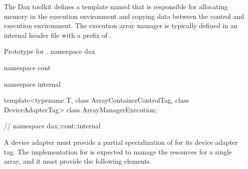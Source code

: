 
The Dax toolkit defines a template named
 that is responsible for allocating
memory in the execution environment and copying data between the control
and execution environment. The execution array manager is typically defined
in an internal header file with a prefix of
.

\begin{daxexample}{Prototype for \protect{}.}
namespace dax {
namespace cont {
namespace internal {

template<typename T, class ArrayContainerControlTag, class DeviceAdapterTag>
class ArrayManagerExecution;

}
}
} // namespace dax::cont::internal
\end{daxexample}

A device adapter must provide a partial specialization of
 for its device adapter tag. The
implementation for  is expected to
manage the resources for a single array, and it must provide the following
elements.

